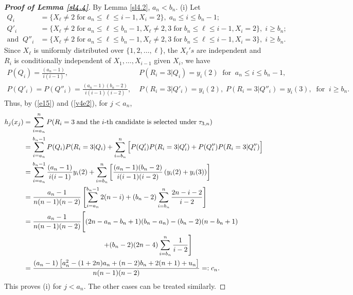 \documentclass[12pt, A4paper, oneside]{article}
\theoremstyle{plain}
\numberwithin{equation}{section}
\begin{document}
\begin{proof}[\bf Proof of Lemma \ref{sl4.4}]
By Lemma \ref{sl4.2}, $a_n<b_n$. (i) Let
\begin{align*}
Q_{i}&=\{X_\ell\neq2\;\mbox{for}\;a_n\le\ell\le i-1,X_i=2\},\; a_n\le i\le b_n-1;\\
Q'_{i}&=\{X_\ell\neq2\;\mbox{for}\;a_n\le\ell\le b_n-1,X_\ell\neq2,3\;\mbox{for}\;b_n\le\ell\le i-1,X_i=2\},\;i\ge b_n;\\
\mbox{and}\;\;Q''_{i}&=\{X_\ell\neq2\;\mbox{for}\;a_n\le\ell\le b_n-1,X_\ell\neq2,3\;\mbox{for}\;b_n\le\ell\le i-1,X_i=3\},\;i\ge b_n.
\end{align*}
Since $X_\ell$ is uniformly distributed over $\{1,2,\dots,\ell\}$, the $X_\ell's$ are independent  and
$R_i$ is conditionally independent of $X_1,\dots,X_{i-1}$ given $X_i$, we have
\begin{align*}
P(Q_{i})=\frac{(a_n-1)}{i(i-1)},\; &P(R_i=3|Q_{i})=y_i(2)\;\;\mbox{for}\;\;a_n\le i\le b_n-1, \\ P(Q'_{i})=P(Q''_{i})=\frac{(a_n-1)(b_n-2)}{i(i-1)(i-2)},\; &P(R_i=3|Q'_{i})=y_i(2),\; P(R_i=3|Q''_{i})=y_i(3),\;\;\mbox{for}\;\;i\ge b_n.
\end{align*}
Thus, by (\ref{e15}) and (\ref{v4e2}), for $j<a_n$,
\begin{align}
h_j(x_j)&=\sum_{i=a_n}^{n}P(R_i=3\;\mbox{and the $i$-th candidate is selected under}\;\tau_{3,n})\notag\\
&=\sum_{i=a_n}^{b_n-1}P(Q_{i})P(R_i=3|Q_{i})+\sum_{i=b_n}^{n}\Big[P(Q'_{i})P(R_i=3|Q'_{i})+P(Q''_{i})P(R_i=3|Q''_{i})\Big]\notag\\
&=\sum_{i=a_n}^{b_n-1}\frac{(a_n-1)}{i(i-1)}y_{i}(2)+\sum_{i=b_n}^{n}\left[\frac{(a_n-1)(b_n-2)}{i(i-1)(i-2)}\left(y_i(2)+y_i(3)\right)\right]\notag\\
&=\frac{a_n-1}{n(n-1)(n-2)}\left[\sum_{i=a_n}^{b_n-1}2(n-i)+(b_n-2)\sum_{i=b_n}^{n}\frac{2n-i-2}{i-2}\right]\notag\\
&=\frac{a_n-1}{n(n-1)(n-2)}\Bigg[(2n-a_n-b_n+1)(b_n-a_n)-(b_n-2)(n-b_n+1)\notag\\
&\hspace*{4cm}\left.+(b_n-2)(2n-4)\sum_{i=b_n}^{n}\frac{1}{i-2}\right]\notag\\
&=\frac{(a_n-1)\left[a_n^2-(1+2n)a_n+(n-2)b_n+2(n+1)+u_n\right]}{n(n-1)(n-2)}=:c_n\label{ae9}.
\end{align}
This proves (i) for $j<a_n$. The other cases can be treated similarly.


\end{proof}
\end{document}
